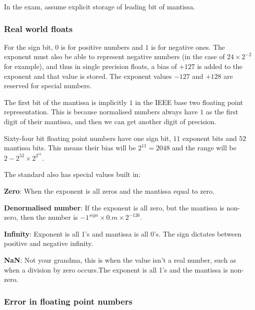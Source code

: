 
In the exam, assume explicit storage of leading bit of mantissa.

\subsubsection{Real world floats}


For the sign bit, $0$ is for positive numbers and $1$ is for negative ones. The
exponent must also be able to represent negative numbers (in the case of
$24\times2^{-2}$ for example), and thus in single precision floats, a bias of
$+127$ is added to the exponent and that value is stored. The exponent values
$-127$ and $+128$ are reserved for special numbers.

The first bit of the mantissa is implicitly $1$ in the IEEE base two floating
point representation. This is because normalised numbers always have $1$ as the
first digit of their mantissa, and then we can get another digit of precision.


Sixty-four bit floating point numbers have one sign bit, $11$ exponent bits and
$52$ mantissa bits. This means their bias will be $2^11 = 2048$ and the range
will be $2 - 2^{52} \times 2^{2^{11}}$.

The standard also has special values built in:

\begin{description}
  \item \textbf{Zero}: When the exponent is all zeros and the mantissa equal to 
  zero.
  \item \textbf{Denormalised number}: If the exponent is all zero, but the
  mantissa is non-zero, then the number is
  $-1^{sign} \times 0.m\times 2^{-126}$.
  \item \textbf{Infinity}: Exponent is all 1's and mantissa is all 0's. The
  sign dictates between positive and negative infinity.
  \item \textbf{NaN}: Not your grandma, this is when the value isn't a real
  number, such as when a division by zero occurs.The exponent is all 1's and
  the mantissa is non-zero.
\end{description}

\subsubsection{Error in floating point numbers}

